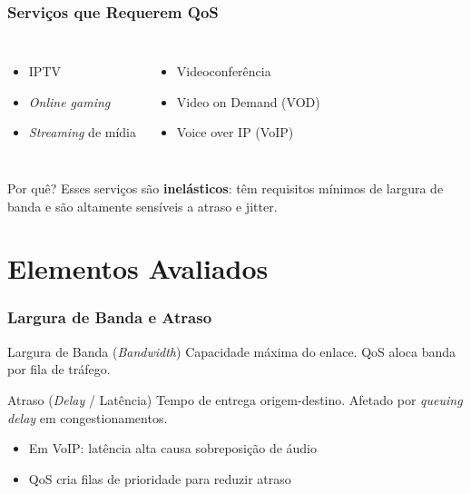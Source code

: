 \documentclass{beamer}
\begin{document}
  \begin{frame}
    \frametitle{Serviços que Requerem QoS}
    \begin{columns}
      \begin{itemize}
        \item IPTV
        \item \textit{Online gaming}
        \item \textit{Streaming} de mídia
      \end{itemize}
      \begin{itemize}
        \item Videoconferência
        \item Video on Demand (VOD)
        \item Voice over IP (VoIP)
      \end{itemize}
    \end{columns}
    \vspace{1em}
    \begin{alertblock}{Por quê?}
      Esses serviços são \textbf{inelásticos}: têm requisitos mínimos de largura
      de banda e são altamente sensíveis a atraso e jitter.
    \end{alertblock}
  \end{frame}

  \section{Elementos Avaliados}

  \begin{frame}
    \frametitle{Largura de Banda e Atraso}
    \begin{block}{Largura de Banda (\textit{Bandwidth})}
      Capacidade máxima do enlace. QoS aloca banda por fila de tráfego.
    \end{block}
    \vspace{0.5em}
    \begin{block}{Atraso (\textit{Delay} / Latência)}
      Tempo de entrega origem-destino. Afetado por \textit{queuing delay} em
      congestionamentos.
      \begin{itemize}
        \item Em VoIP: latência alta causa sobreposição de áudio
        \item QoS cria filas de prioridade para reduzir atraso
      \end{itemize}
    \end{block}
  \end{frame}
\end{document}
